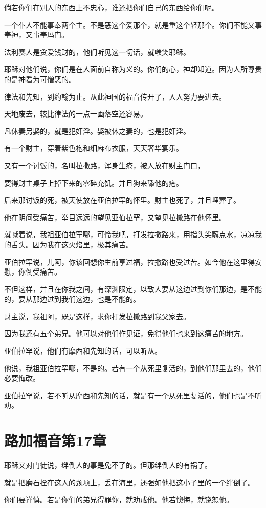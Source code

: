 \documentclass[12pt,oneside]{book}
\begin{document}
倘若你们在别人的东西上不忠心，谁还把你们自己的东西给你们呢。

一个仆人不能事奉两个主。不是恶这个爱那个，就是重这个轻那个。你们不能又事奉神，又事奉玛门。

法利赛人是贪爱钱财的，他们听见这一切话，就嗤笑耶稣。

耶稣对他们说，你们是在人面前自称为义的。你们的心，神却知道。因为人所尊贵的是神看为可憎恶的。

律法和先知，到约翰为止。从此神国的福音传开了，人人努力要进去。

天地废去，较比律法的一点一画落空还容易。

凡休妻另娶的，就是犯奸淫。娶被休之妻的，也是犯奸淫。

有一个财主，穿着紫色袍和细麻布衣服，天天奢华宴乐。

又有一个讨饭的，名叫拉撒路，浑身生疮，被人放在财主门口，

要得财主桌子上掉下来的零碎充饥。并且狗来舔他的疮。

后来那讨饭的死，被天使放在亚伯拉罕的怀里。财主也死了，并且埋葬了。

他在阴间受痛苦，举目远远的望见亚伯拉罕，又望见拉撒路在他怀里。

就喊着说，我祖亚伯拉罕哪，可怜我吧，打发拉撒路来，用指头尖蘸点水，凉凉我的舌头。因为我在这火焰里，极其痛苦。

亚伯拉罕说，儿阿，你该回想你生前享过福，拉撒路也受过苦。如今他在这里得安慰，你倒受痛苦。

不但这样，并且在你我之间，有深渊限定，以致人要从这边过到你们那边，是不能的，要从那边过到我们这边，也是不能的。

财主说，我祖阿，既是这样，求你打发拉撒路到我父家去。

因为我还有五个弟兄。他可以对他们作见证，免得他们也来到这痛苦的地方。

亚伯拉罕说，他们有摩西和先知的话，可以听从。

他说，我祖亚伯拉罕哪，不是的。若有一个从死里复活的，到他们那里去的，他们必要悔改。

亚伯拉罕说，若不听从摩西和先知的话，就是有一个从死里复活的，他们也是不听劝。

\chapter{路加福音第17章}
耶稣又对门徒说，绊倒人的事是免不了的。但那绊倒人的有祸了。

就是把磨石拴在这人的颈项上，丢在海里，还强如他把这小子里的一个绊倒了。

你们要谨慎。若是你们的弟兄得罪你，就劝戒他。他若懊悔，就饶恕他。
\end{document}
